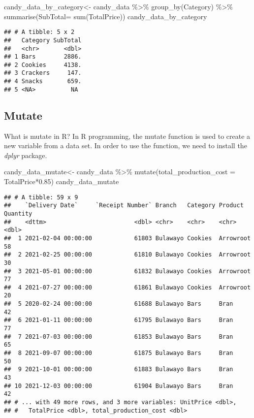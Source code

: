 \documentclass[
]{article}
\newenvironment{Shaded}{\begin{snugshade}}{\end{snugshade}}
\newcommand{\AttributeTok}[1]{\textcolor[rgb]{0.77,0.63,0.00}{#1}}
\newcommand{\FloatTok}[1]{\textcolor[rgb]{0.00,0.00,0.81}{#1}}
\newcommand{\FunctionTok}[1]{\textcolor[rgb]{0.00,0.00,0.00}{#1}}
\newcommand{\NormalTok}[1]{#1}
\newcommand{\OtherTok}[1]{\textcolor[rgb]{0.56,0.35,0.01}{#1}}
\newcommand{\SpecialCharTok}[1]{\textcolor[rgb]{0.00,0.00,0.00}{#1}}
\begin{document}
\begin{Shaded}
\begin{Highlighting}[]
\NormalTok{candy\_data\_by\_category}\OtherTok{\textless{}{-}}\NormalTok{ candy\_data }\SpecialCharTok{\%\textgreater{}\%} \FunctionTok{group\_by}\NormalTok{(Category) }\SpecialCharTok{\%\textgreater{}\%} \FunctionTok{summarise}\NormalTok{(}\AttributeTok{SubTotal=} \FunctionTok{sum}\NormalTok{(TotalPrice))}
\NormalTok{candy\_data\_by\_category}
\end{Highlighting}
\end{Shaded}

\begin{verbatim}
## # A tibble: 5 x 2
##   Category SubTotal
##   <chr>       <dbl>
## 1 Bars        2886.
## 2 Cookies     4138.
## 3 Crackers     147.
## 4 Snacks       659.
## 5 <NA>          NA
\end{verbatim}

\hypertarget{mutate}{%
\subsection{Mutate}\label{mutate}}

What is mutate in R? In R programming, the mutate function is used to
create a new variable from a data set. In order to use the function, we
need to install the \emph{dplyr} package.

\begin{Shaded}
\begin{Highlighting}[]
\NormalTok{candy\_data\_mutate}\OtherTok{\textless{}{-}}\NormalTok{ candy\_data }\SpecialCharTok{\%\textgreater{}\%} \FunctionTok{mutate}\NormalTok{(}\AttributeTok{total\_production\_cost =}\NormalTok{ TotalPrice}\SpecialCharTok{*}\FloatTok{0.85}\NormalTok{)}
\NormalTok{candy\_data\_mutate}
\end{Highlighting}
\end{Shaded}

\begin{verbatim}
## # A tibble: 59 x 9
##    `Delivery Date`     `Receipt Number` Branch   Category Product   Quantity
##    <dttm>                         <dbl> <chr>    <chr>    <chr>        <dbl>
##  1 2021-02-04 00:00:00            61803 Bulawayo Cookies  Arrowroot       58
##  2 2021-02-25 00:00:00            61810 Bulawayo Cookies  Arrowroot       30
##  3 2021-05-01 00:00:00            61832 Bulawayo Cookies  Arrowroot       77
##  4 2021-07-27 00:00:00            61861 Bulawayo Cookies  Arrowroot       20
##  5 2020-02-24 00:00:00            61688 Bulawayo Bars     Bran            42
##  6 2021-01-11 00:00:00            61795 Bulawayo Bars     Bran            77
##  7 2021-07-03 00:00:00            61853 Bulawayo Bars     Bran            65
##  8 2021-09-07 00:00:00            61875 Bulawayo Bars     Bran            50
##  9 2021-10-01 00:00:00            61883 Bulawayo Bars     Bran            43
## 10 2021-12-03 00:00:00            61904 Bulawayo Bars     Bran            42
## # ... with 49 more rows, and 3 more variables: UnitPrice <dbl>,
## #   TotalPrice <dbl>, total_production_cost <dbl>
\end{verbatim}
\end{document}
